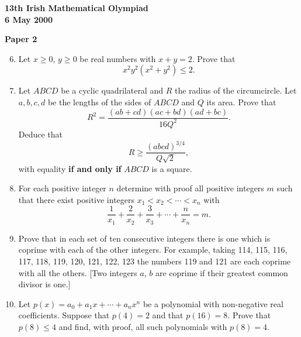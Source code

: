 \documentclass[12pt]{article}
\begin{document}
\newpage
\begin{center}
{\large\bfseries 13th Irish Mathematical Olympiad\\6 May 2000}
\end{center}
\bigskip\noindent\textbf{Paper 2}\bigskip
\begin{enumerate}
\setcounter{enumi}{5}
\item Let $x \geq 0$, $y \geq 0$ be real numbers with $x + y = 2$. Prove that
\[
x^2 y^2 (x^2 + y^2) \leq 2.
\]

\item Let $ABCD$ be a cyclic quadrilateral and $R$ the radius of the circumcircle. Let $a, b, c, d$ be the lengths of the sides of $ABCD$ and $Q$ its area. Prove that
\[
R^2 = \frac{(ab+cd)(ac+bd)(ad+bc)}{16Q^2}.
\]
Deduce that
\[
R \geq \frac{(abcd)^{3/4}}{Q\sqrt{2}},
\]
with equality \textbf{if and only if} $ABCD$ is a square.

\item For each positive integer $n$ determine with proof all positive integers $m$ such that there exist positive integers $x_1 < x_2 < \cdots < x_n$ with
\[
\frac{1}{x_1} + \frac{2}{x_2} + \frac{3}{x_3} + \cdots + \frac{n}{x_n} = m.
\]

\item Prove that in each set of ten consecutive integers there is one which is coprime with each of the other integers.
For example, taking 114, 115, 116, 117, 118, 119, 120, 121, 122, 123 the numbers 119 and 121 are each coprime with all the others. [Two integers $a$, $b$ are coprime if their greatest common divisor is one.]

\item Let $p(x) = a_0 + a_1 x + \cdots + a_n x^n$ be a polynomial with non-negative real coefficients. Suppose that $p(4) = 2$ and that $p(16) = 8$. Prove that $p(8) \leq 4$ and find, with proof, all such polynomials with $p(8) = 4$.

\end{enumerate}
\end{document}
